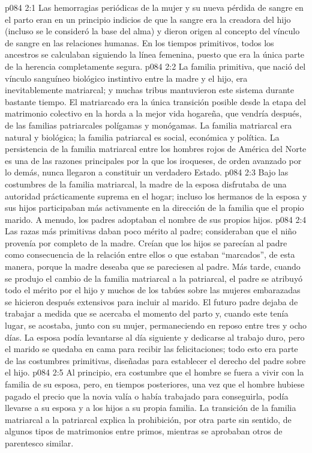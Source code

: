 \vs p084 2:1 Las hemorragias periódicas de la mujer y su nueva pérdida de sangre en el parto eran en un principio indicios de que la sangre era la creadora del hijo (incluso se le consideró la base del alma) y dieron origen al concepto del vínculo de sangre en las relaciones humanas. En los tiempos primitivos, todos los ancestros se calculaban siguiendo la línea femenina, puesto que era la única parte de la herencia completamente segura.
\vs p084 2:2 La familia primitiva, que nació del vínculo sanguíneo biológico instintivo entre la madre y el hijo, era inevitablemente matriarcal; y muchas tribus mantuvieron este sistema durante bastante tiempo. El matriarcado era la única transición posible desde la etapa del matrimonio colectivo en la horda a la mejor vida hogareña, que vendría después, de las familias patriarcales polígamas y monógamas. La familia matriarcal era natural y biológica; la familia patriarcal es social, económica y política. La persistencia de la familia matriarcal entre los hombres rojos de América del Norte es una de las razones principales por la que los iroqueses, de orden avanzado por lo demás, nunca llegaron a constituir un verdadero Estado.
\vs p084 2:3 Bajo las costumbres de la familia matriarcal, la madre de la esposa disfrutaba de una autoridad prácticamente suprema en el hogar; incluso los hermanos de la esposa y sus hijos participaban más activamente en la dirección de la familia que el propio marido. A menudo, los padres adoptaban el nombre de sus propios hijos.
\vs p084 2:4 Las razas más primitivas daban poco mérito al padre; consideraban que el niño provenía por completo de la madre. Creían que los hijos se parecían al padre como consecuencia de la relación entre ellos o que estaban “marcados”, de esta manera, porque la madre deseaba que se pareciesen al padre. Más tarde, cuando se produjo el cambio de la familia matriarcal a la patriarcal, el padre se atribuyó todo el mérito por el hijo y muchos de los tabúes sobre las mujeres embarazadas se hicieron después extensivos para incluir al marido. El futuro padre dejaba de trabajar a medida que se acercaba el momento del parto y, cuando este tenía lugar, se acostaba, junto con su mujer, permaneciendo en reposo entre tres y ocho días. La esposa podía levantarse al día siguiente y dedicarse al trabajo duro, pero el marido se quedaba en cama para recibir las felicitaciones; todo esto era parte de las costumbres primitivas, diseñadas para establecer el derecho del padre sobre el hijo.
\vs p084 2:5 Al principio, era costumbre que el hombre se fuera a vivir con la familia de su esposa, pero, en tiempos posteriores, una vez que el hombre hubiese pagado el precio que la novia valía o había trabajado para conseguirla, podía llevarse a su esposa y a los hijos a su propia familia. La transición de la familia matriarcal a la patriarcal explica la prohibición, por otra parte sin sentido, de algunos tipos de matrimonios entre primos, mientras se aprobaban otros de parentesco similar.
